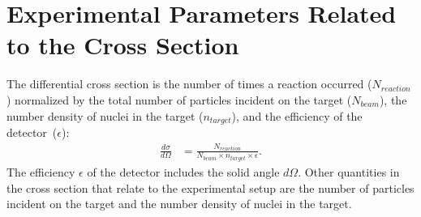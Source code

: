 \section{Experimental Parameters Related to the Cross Section}

The differential cross section is the number of times a reaction occurred ($N_{reaction}$) normalized by the total number of particles incident on the target ($N_{beam}$), the number density of nuclei in the target ($n_{target}$), and the {efficiency of the detector}~($\epsilon$):
\begin{align}
\frac{d\sigma}{d\Omega} &= \frac{N_{reaction}}{N_{beam} \times n_{target} \times \epsilon}.
\label{eq:cross_section}
\end{align}
The efficiency $\epsilon$ of the detector includes the solid angle $d\Omega$.  Other quantities in the cross section that relate to the experimental setup are the number of particles incident on the target and the number density of nuclei in the target.

